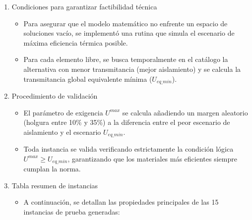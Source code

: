 \begin{enumerate}
\begin{itemize}
\item Los datos se almacenan en tiempo de ejecución mediante diccionarios y listas, lo que permite asociar fácilmente un identificador, área y estado ("fijo" o "libre") a cada elemento constructivo.
\end{itemize}
\item Condiciones para garantizar factibilidad técnica
\begin{itemize}
\item Para asegurar que el modelo matemático no enfrente un espacio de soluciones vacío, se implementó una rutina que simula el escenario de máxima eficiencia térmica posible.
\item Para cada elemento libre, se busca temporalmente en el catálogo la alternativa con menor transmitancia (mejor aislamiento) y se calcula la transmitancia global equivalente mínima ($U_{eq\_min}$).
\end{itemize}
\item Procedimiento de validación
\begin{itemize}
\item El parámetro de exigencia $U^{max}$ se calcula añadiendo un margen aleatorio (holgura entre 10\% y 35\%) a la diferencia entre el peor escenario de aislamiento y el escenario $U_{eq\_min}$.
\item Toda instancia se valida verificando estrictamente la condición lógica $U^{max} \geq U_{eq\_min}$, garantizando que los materiales más eficientes siempre cumplan la norma.
\end{itemize}
\item Tabla resumen de instancias
\begin{itemize}
\item A continuación, se detallan las propiedades principales de las 15 instancias de prueba generadas:
\end{itemize}
\end{enumerate}

